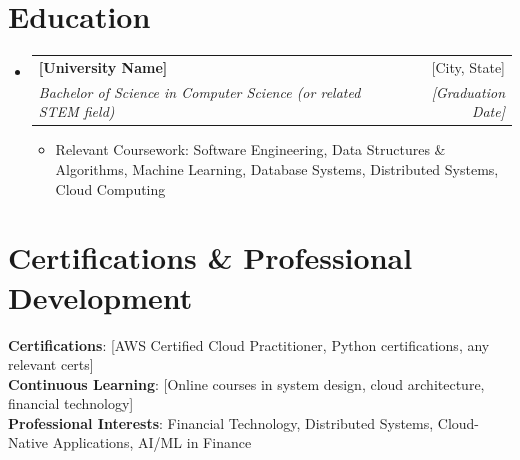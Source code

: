 \documentclass[letterpaper,11pt]{article}
\makeatletter
\newcommand{\resumeItem}[1]{
  \item\small{
    {#1 \vspace{-2pt}}
  }
}
\newcommand{\resumeSubheading}[4]{
  \vspace{-2pt}\item
    \begin{tabular*}{0.97\textwidth}[t]{l@{\extracolsep{\fill}}r}
      \textbf{#1} & #2 \\
      \textit{\small#3} & \textit{\small #4} \\
    \end{tabular*}\vspace{-7pt}
}
\newcommand{\resumeSubHeadingListStart}{\begin{itemize}[leftmargin=0.15in, label={}]}
\newcommand{\resumeSubHeadingListEnd}{\end{itemize}}
\newcommand{\resumeItemListStart}{\begin{itemize}}
\newcommand{\resumeItemListEnd}{\end{itemize}\vspace{-5pt}}
\makeatother
\begin{document}
\section{Education}
  \resumeSubHeadingListStart
    \resumeSubheading
      {[University Name]}{[City, State]}
      {Bachelor of Science in Computer Science (or related STEM field)}{[Graduation Date]}
      \resumeItemListStart
        \resumeItem{Relevant Coursework: Software Engineering, Data Structures \& Algorithms, Machine Learning, Database Systems, Distributed Systems, Cloud Computing}
      \resumeItemListEnd
  \resumeSubHeadingListEnd

\section{Certifications \& Professional Development}
 \begin{itemize}[leftmargin=0.15in, label={}]
    \small{\item{
     \textbf{Certifications}{: [AWS Certified Cloud Practitioner, Python certifications, any relevant certs]} \\
     \textbf{Continuous Learning}{: [Online courses in system design, cloud architecture, financial technology]} \\
     \textbf{Professional Interests}{: Financial Technology, Distributed Systems, Cloud-Native Applications, AI/ML in Finance}
    }}
 \end{itemize}

\end{document}

